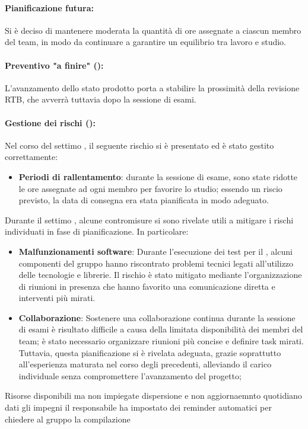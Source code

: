 \paragraph*{Pianificazione futura:}
\par Si è deciso di mantenere moderata la quantità di ore assegnate a ciascun membro del team, in modo da continuare a garantire un equilibrio tra lavoro e studio.

\paragraph*{Preventivo "a finire" ():}
\par L'avanzamento dello stato prodotto porta a stabilire la prossimità della revisione RTB, che avverrà tuttavia dopo la sessione di esami.

\paragraph*{Gestione dei rischi ():}
\par Nel corso del settimo , il seguente rischio si è presentato ed è stato gestito correttamente:
\begin{itemize}
  \item \textbf{Periodi di rallentamento}: durante la sessione di esame, sono state ridotte le ore assegnate ad ogni membro per favorire lo studio; essendo un riscio previsto, la data di consegna era stata pianificata in modo adeguato.
\end{itemize}

\vspace{0.5\baselineskip}
\par Durante il settimo , alcune contromisure si sono rivelate utili a mitigare i rischi individuati in fase di pianificazione. In particolare:
\begin{itemize}
  \item \textbf{Malfunzionamenti software}: Durante l'esecuzione dei test per il , alcuni componenti del gruppo hanno riscontrato problemi tecnici legati all'utilizzo delle tecnologie e librerie. Il rischio è stato mitigato mediante l'organizzazione di riunioni in presenza che hanno favorito una comunicazione diretta e interventi più mirati.
  \item \textbf{Collaborazione}: Sostenere una collaborazione continua durante la sessione di esami è risultato difficile a causa della limitata disponibilità dei membri del team; è stato necessario organizzare riunioni più concise e definire task mirati. Tuttavia, questa pianificazione si è rivelata adeguata, grazie soprattutto all'esperienza maturata nel corso degli  precedenti, alleviando il carico individuale senza compromettere l'avanzamento del progetto;
\end{itemize}

Risorse disponibili ma non impiegate dispersione e non aggiornaemnto quotidiano dati gli impegni il responsabile ha impostato dei reminder automatici per chiedere al gruppo la compilazione
